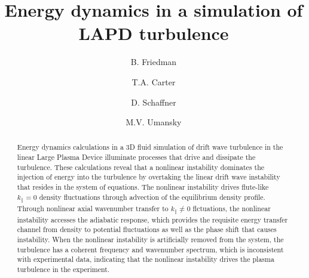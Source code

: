 \documentclass[twocolumn,showpacs,preprintnumbers,amsmath,amssymb]{revtex4}
\begin{document}
\title{Energy dynamics in a simulation of LAPD turbulence}

\author{B. Friedman}

\author{T.A. Carter}
\author{D. Schaffner}


\author{M.V. Umansky}





\begin{abstract}
Energy dynamics calculations in a 3D fluid simulation of drift wave turbulence in the linear Large Plasma Device \cite{Gekelman1991} illuminate processes that drive and dissipate the turbulence.
These calculations reveal that a nonlinear instability dominates the injection of energy into the turbulence by overtaking the linear drift wave instability that resides in the system of equations.
The nonlinear instability drives flute-like $k_\parallel = 0$ density fluctuations through advection of the equilibrium density profile. 
Through nonlinear axial wavenumber transfer to $k_\parallel \ne 0$ flctuations, the nonlinear instability accesses the adiabatic response, 
which provides the requisite energy transfer channel from density to potential fluctuations as well as the
phase shift that causes instability. When the nonlinear instability is artificially removed from the system, the turbulence has a coherent frequency and wavenumber spectrum, which is inconsistent
with experimental data, indicating that the nonlinear instability drives the plasma turbulence in the experiment.
\end{abstract}

\maketitle
\end{document}
